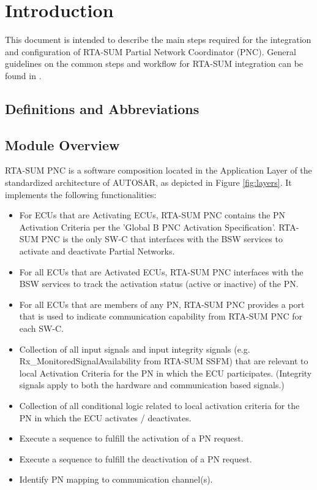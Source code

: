\chapter{Introduction}
This document is intended to describe the main steps required for the integration and configuration of RTA-SUM Partial Network Coordinator (PNC). 
\ifnum {}
{General guidelines on the common steps and workflow for RTA-SUM integration can be found in .}
\else
{}
\fi

\section{Definitions and Abbreviations}



\section{Module Overview}
RTA-SUM PNC is a software composition located in the Application Layer of the standardized architecture of AUTOSAR, as depicted in Figure \ref{fig:layers}. It implements the following functionalities:
\begin{itemize}
	\item For ECUs that are Activating ECUs, RTA-SUM PNC contains the PN Activation Criteria per the 'Global B PNC Activation Specification'. RTA-SUM PNC is the only SW-C that interfaces with the BSW services to activate and deactivate Partial Networks.
	\item For all ECUs that are Activated ECUs, RTA-SUM PNC interfaces with the BSW services to track the activation status (active or inactive) of the PN.
	\item For all ECUs that are members of any PN, RTA-SUM PNC provides a port that is used to indicate communication capability from RTA-SUM PNC for each SW-C.
	\item Collection of all input signals and input integrity signals (e.g. Rx\_MonitoredSignalAvailability from RTA-SUM SSFM) that are relevant to local Activation Criteria for the PN in which the ECU participates. (Integrity signals apply to both the hardware and communication based signals.)
	\item Collection of all conditional logic related to local activation criteria for the PN in which the ECU activates / deactivates.
	\item Execute a sequence to fulfill the activation of a PN request.
	\item Execute a sequence to fulfill the deactivation of a PN request.
	\item Identify PN mapping to communication channel(s).
\end{itemize}


